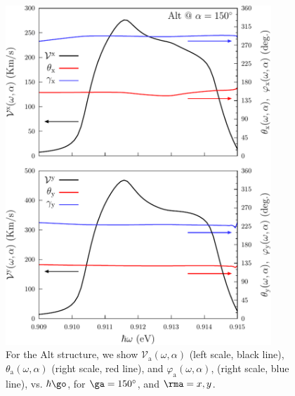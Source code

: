 \documentclass[floatfix,prb,aps,superscriptaddress,showpacs,11pt,preprint,letterpaper]{revtex4}
\def\tama{10cm}
\begin{document}
\begin{figure}[tb]
\centering
\includegraphics[width=\tama]{altplots/alt-vx-vy-w2}
\caption{For the Alt structure, we show $\mathcal{V}_{\mathrm{a}}
(\omega,\alpha)$ (left scale, black line), $\theta_{\mathrm{a}}
(\omega,\alpha)$ (right scale, red line), and $\varphi_{\mathrm{a}}
(\omega,\alpha)$, (right scale, blue line), vs. $\hbar\go$, for
$\ga=150^\circ$, and $\rma=x,y$. }
\label{fig:alt-vx-vy-w2}
\end{figure}
\end{document}
